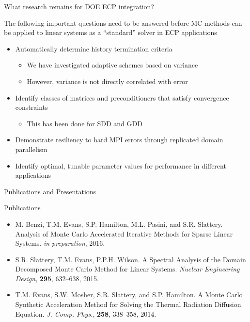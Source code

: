 \documentclass{beamer}
\begin{document}
\begin{frame}{What research remains for DOE ECP integration?}

  The following important questions need to be answered before MC methods can
  be applied to linear systems as a ``standard'' solver in ECP applications

  \begin{itemize}
  \item Automatically determine history termination criteria
    \begin{itemize}
    \item We have investigated adaptive schemes based on variance
    \item However, variance is not directly correlated with error
    \end{itemize}
  \item Identify classes of matrices and preconditioners that satisfy
    convergence constraints
    \begin{itemize}
    \item This has been done for SDD and GDD
    \end{itemize}
  \item Demonstrate resiliency to hard MPI errors through replicated domain
    parallelism
  \item Identify optimal, tunable parameter values for performance in
    different applications
  \end{itemize}
\end{frame}


\begin{frame}{Publications and Presentations}

  \underline{Publications}
  \begin{itemize}
  \item M. Benzi, T.M. Evans, S.P. Hamilton, M.L. Pasini, and
    S.R. Slattery. Analysis of Monte Carlo Accelerated Iterative Methods for
    Sparse Linear Systems. \textit{in preparation}, 2016.
  \item S.R. Slattery, T.M. Evans, P.P.H. Wilson. A Spectral Analysis of the
    Domain Decomposed Monte Carlo Method for Linear Systems. \textit{Nuclear
      Engineering Design},  {\bf 295}, 632--638, 2015.
  \item T.M. Evans, S.W. Mosher, S.R. Slattery, and S.P. Hamilton. A Monte Carlo
    Synthetic Acceleration Method for Solving the Thermal Radiation Diffusion
    Equation. \textit{J. Comp. Phys.}, {\bf 258}, 338--358, 2014.
  \end{itemize}

\end{frame}
\end{document}
